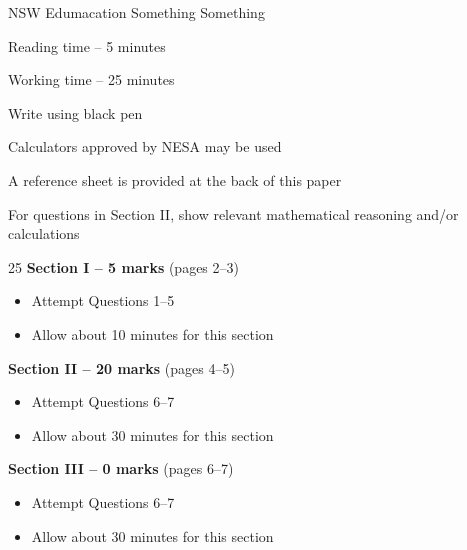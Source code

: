 \begin{coverpage}{}
    NSW Edumacation Something Something     %
    \vspace{2cm}    %
    

    
    \vspace{1cm}    %
    
    \begin{generalinstructions}                        
        \item Reading time -- 5 minutes
        \item Working time -- 25 minutes
        \item Write using black pen
        \item Calculators approved by NESA may be used
        \item A reference sheet is provided at the back of this paper
        \item For questions in Section II, show relevant mathematical reasoning and/or calculations
    \end{generalinstructions}
    
    \vspace{1cm}    %
    
    \begin{sectionlist}{25}
        \textbf{Section I -- 5 marks} (pages 2--3)   
        \begin{itemize}     %
            \item Attempt Questions 1--5
            \item Allow about 10 minutes for this section
        \end{itemize}
        \textbf{Section II -- 20 marks} (pages 4--5)   
        \begin{itemize}     %
            \item Attempt Questions 6--7
            \item Allow about 30 minutes for this section
        \end{itemize}
        \textbf{Section III -- 0 marks} (pages 6--7)   
        \begin{itemize}     %
            \item Attempt Questions 6--7
            \item Allow about 30 minutes for this section
        \end{itemize}
\end{sectionlist}

\end{coverpage}